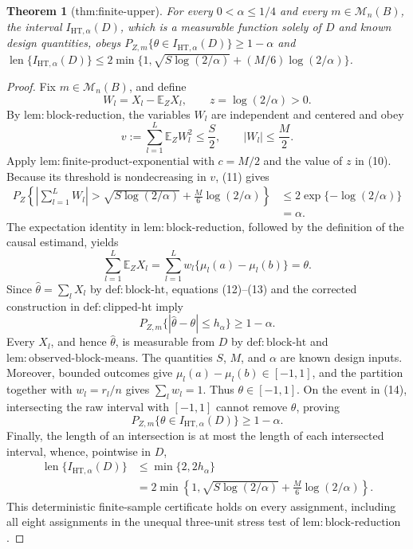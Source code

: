 \documentclass{article}
\newtheorem{theorem}{Theorem}
\begin{document}
\begin{theorem}[thm:finite-upper]\label{thm:finite-upper}
For every \(0<\alpha\le1/4\) and every \(m\in\mathcal M_n(B)\), the interval \(I_{\mathrm{HT},\alpha}(D)\), which is a measurable function solely of \(D\) and known design quantities, obeys \(P_{Z,m}\{\theta\in I_{\mathrm{HT},\alpha}(D)\}\ge1-\alpha\) and \(\operatorname{len}\{I_{\mathrm{HT},\alpha}(D)\}\le2\min\{1,\sqrt{S\log(2/\alpha)}+(M/6)\log(2/\alpha)\}\).
\end{theorem}
\begin{proof}
Fix \(m\in\mathcal M_n(B)\), and define
\[
 W_l=X_l-\mathbb E_ZX_l,\qquad z=\log(2/\alpha)>0.
\tag{10}
\]
By \(\mathrm{lem{:}block\text{-}reduction}\), the variables \(W_l\) are independent and centered and obey
\[
 v:=\sum_{l=1}^L\mathbb E_ZW_l^2\le\frac S2,
 \qquad |W_l|\le\frac M2.
\tag{11}
\]
Apply \(\mathrm{lem{:}finite\text{-}product\text{-}exponential}\) with \(c=M/2\) and the value of \(z\) in (10). Because its threshold is nondecreasing in \(v\), (11) gives
\[
\begin{aligned}
 P_Z\!\left\{\left|\sum_{l=1}^LW_l\right|>
 \sqrt{S\log(2/\alpha)}+\frac M6\log(2/\alpha)\right\}
 &\le2\exp\{-\log(2/\alpha)\}\\
 &=\alpha.
\end{aligned}
\tag{12}
\]
The expectation identity in \(\mathrm{lem{:}block\text{-}reduction}\), followed by the definition of the causal estimand, yields
\[
 \sum_{l=1}^L\mathbb E_ZX_l
 =\sum_{l=1}^Lw_l\{\mu_l(a)-\mu_l(b)\}=\theta.
\tag{13}
\]
Since \(\widehat\theta=\sum_lX_l\) by \(\mathrm{def{:}block\text{-}ht}\), equations (12)--(13) and the corrected construction in \(\mathrm{def{:}clipped\text{-}ht}\) imply
\[
 P_{Z,m}\{|\widehat\theta-\theta|\le h_\alpha\}\ge1-\alpha.
\tag{14}
\]
Every \(X_l\), and hence \(\widehat\theta\), is measurable from \(D\) by \(\mathrm{def{:}block\text{-}ht}\) and \(\mathrm{lem{:}observed\text{-}block\text{-}means}\). The quantities \(S\), \(M\), and \(\alpha\) are known design inputs. Moreover, bounded outcomes give \(\mu_l(a)-\mu_l(b)\in[-1,1]\), and the partition together with \(w_l=r_l/n\) gives \(\sum_lw_l=1\). Thus \(\theta\in[-1,1]\). On the event in (14), intersecting the raw interval with \([-1,1]\) cannot remove \(\theta\), proving
\[
 P_{Z,m}\{\theta\in I_{\mathrm{HT},\alpha}(D)\}\ge1-\alpha.
\tag{15}
\]
Finally, the length of an intersection is at most the length of each intersected interval, whence, pointwise in \(D\),
\[
\begin{aligned}
 \operatorname{len}\{I_{\mathrm{HT},\alpha}(D)\}
 &\le\min\{2,2h_\alpha\}\\
 &=2\min\!\left\{1,\sqrt{S\log(2/\alpha)}
       +\frac M6\log(2/\alpha)\right\}.
\end{aligned}
\tag{16}
\]
This deterministic finite-sample certificate holds on every assignment, including all eight assignments in the unequal three-unit stress test of \(\mathrm{lem{:}block\text{-}reduction}\).
\end{proof}
\end{document}
